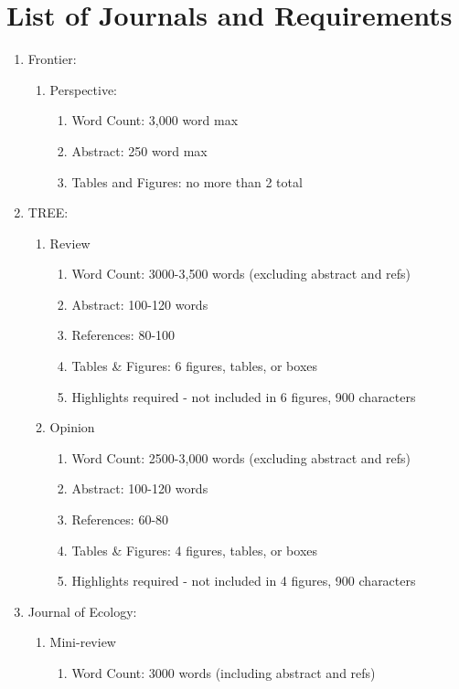 \documentclass{article}\usepackage[]{graphicx}\usepackage[]{color}
\begin{document}
\section*{List of Journals and Requirements}
\begin{enumerate}
  \item Frontier: 
  \begin{enumerate}
    \item Perspective: 
    \begin {enumerate}
    \item Word Count: 3,000 word max
    \item Abstract: 250 word max
    \item Tables and Figures: no more than 2 total 
    \end{enumerate}
  \end{enumerate}
  \item TREE:
  \begin{enumerate}
    \item Review
    \begin{enumerate}
    \item Word Count: 3000-3,500 words (excluding abstract and refs)
    \item Abstract: 100-120 words
    \item References: 80-100
    \item Tables \& Figures: 6 figures, tables, or boxes
    \item Highlights required - not included in 6 figures, 900 characters
    \end{enumerate}
     \item Opinion
    \begin{enumerate}
    \item Word Count: 2500-3,000 words (excluding abstract and refs)
    \item Abstract: 100-120 words
    \item References: 60-80
    \item Tables \& Figures: 4 figures, tables, or boxes
    \item Highlights required - not included in 4 figures, 900 characters
    \end{enumerate}
  \end{enumerate}
  \item Journal of Ecology:
  \begin{enumerate}
    \item Mini-review
    \begin{enumerate}
    \item Word Count: 3000 words (including abstract and refs)

\end{enumerate}
\end{enumerate}
\end{enumerate}
\end{document}
